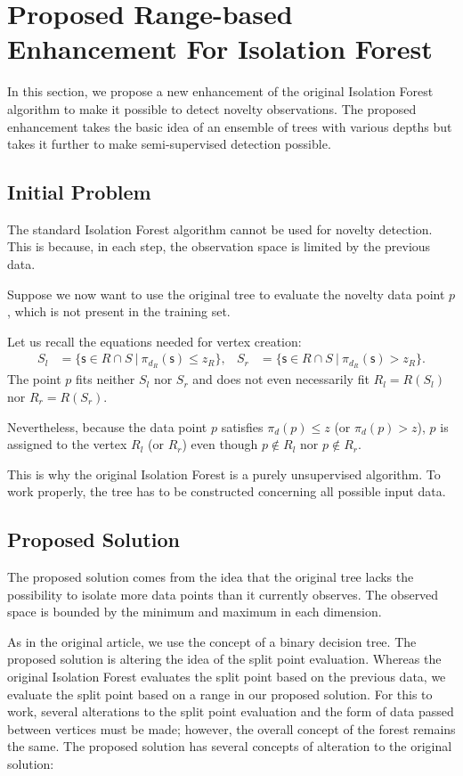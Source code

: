 \section{Proposed Range-based Enhancement For Isolation Forest}
\label{sec:novelty_isolation_forest}
In this section, we propose a new enhancement of the original Isolation Forest algorithm to make it possible to detect novelty observations.
The proposed enhancement takes the basic idea of an ensemble of trees with various depths but takes it further to make semi-supervised detection possible.

\subsection{Initial Problem}
\label{sec:InitialProblem}
 The standard Isolation Forest algorithm cannot be used for novelty detection. This is because, in each step, the observation space is limited by the previous data.


Suppose we now want to use the original tree to evaluate the novelty data point $p$, which is not present in the training set.

Let us recall the equations needed for vertex creation:
\begin{align*}
S_l &= \{ \mathsf{s} \in{R \cap S}\ |\ \pi_{d_R}(\mathsf{s})\le z_R\},&
S_r &= \{ \mathsf{s} \in{R \cap S}\ |\ \pi_{d_R}(\mathsf{s}) > z_R\}.
\end{align*}
The point $p$ fits neither $S_l$ nor $S_r$ and does not even necessarily fit $R_l = R(S_l)$ nor $R_r = R(S_r)$. 

Nevertheless, because the data point $p$ satisfies  $\pi_d(p) \le z$ (or $\pi_d(p) > z$), $p$ is assigned to the vertex $R_l$ (or $R_r$) even though $p \notin R_l$ nor $p \notin R_r$.

This is why the original Isolation Forest is a purely unsupervised algorithm. To work properly, the tree has to be constructed concerning all possible input data.

\subsection{Proposed Solution}
The proposed solution comes from the idea that the original tree lacks the possibility to isolate more data points than it currently observes.
The observed space is bounded by the minimum and maximum in each dimension.

As in the original article, we use the concept of a binary decision tree. The proposed solution is altering the idea of the split point evaluation. Whereas the original Isolation Forest evaluates the split point based on the previous data, we
evaluate the split point based on a range in our proposed solution. For this to work, several alterations to the split point evaluation and the form of data passed between vertices must be made; however, the overall concept of the forest remains the same.
The proposed solution has several concepts of alteration to the original solution:

